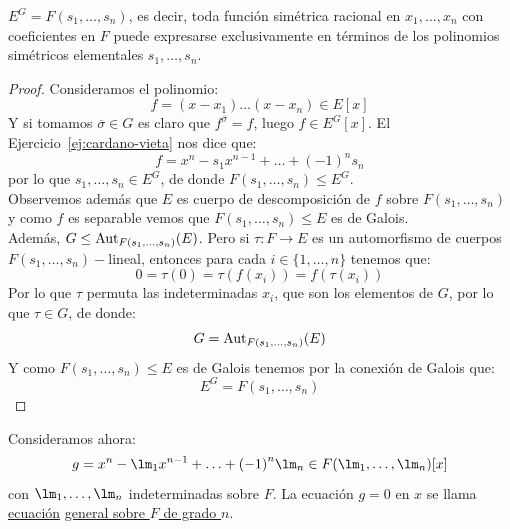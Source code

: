 \begin{prop}
    $E^G = F(s_1,\ldots, s_n)$, es decir, toda función simétrica racional en $x_1,\ldots,x_n$ con coeficientes en $F$ puede expresarse exclusivamente en términos de los polinomios simétricos elementales $s_1,\ldots,s_n$.
    \begin{proof}
        Consideramos el polinomio:
        \begin{equation*}
            f = (x-x_1) \ldots (x-x_n) \in E[x]
        \end{equation*}
        Y si tomamos $\overline{\sigma}\in G$ es claro que $f^{\overline{\sigma}} = f$, luego $f\in E^G[x]$. El Ejercicio~\ref{ej:cardano-vieta} nos dice que:
        \begin{equation*}
            f = x^n-s_1x^{n-1} + \ldots + {(-1)}^{n}s_n 
        \end{equation*}
        por lo que $s_1,\ldots,s_n \in E^G$, de donde $F(s_1,\ldots,s_n) \leq E^G$.\\

        \noindent
        Observemos además que $E$ es cuerpo de descomposición de $f$ sobre $F(s_1,\ldots,s_n)$ y como $f$ es separable vemos que $F(s_1,\ldots,s_n)\leq E$ es de Galois.\\

        \noindent
        Además, $G\leq \operatorname{Aut}_{F(s_1, \ldots, s_n)}(E)$. Pero si $\tau:F\to E$ es un automorfismo de cuerpos $F(s_1, \ldots, s_n)-$lineal, entonces para cada $i \in \{1,\ldots,n\}$ tenemos que:
        \begin{equation*}
            0 = \tau(0) = \tau(f(x_i)) = f(\tau(x_i))
        \end{equation*}
        Por lo que $\tau$ permuta las indeterminadas $x_i$, que son los elementos de $G$, por lo que $\tau \in G$, de donde:
        \begin{equation*}
            G = \operatorname{Aut}_{F(s_1, \ldots, s_n)}(E)
        \end{equation*}
        Y como $F(s_1, \ldots, s_n)\leq E$ es de Galois tenemos por la conexión de Galois que:
        \begin{equation*}
            E^G = F(s_1, \ldots, s_n)
        \end{equation*}
    \end{proof}
\end{prop}

\noindent
Consideramos ahora:
\begin{equation*}
    g = x^n - \lm_1 x^{n-1} + \ldots + {(-1)}^{n}\lm_n \in F(\lm_1, \ldots, \lm_n)[x]
\end{equation*}
con $\lm_1, \ldots, \lm_n$ indeterminadas sobre $F$. La ecuación $g=0$ en $x$ se llama \underline{ecuación} \underline{general sobre $F$ de grado $n$}.

